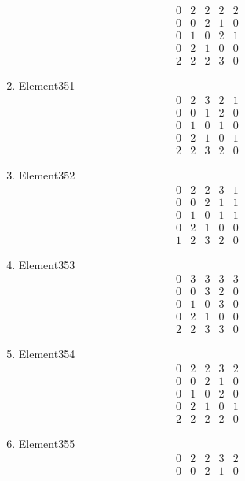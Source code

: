 \documentclass[12pt]{article}
\begin{document}
\begin{multicols}{3}
\begin{enumerate}
\begin{equation*}
\begin{array}{ccccc}
0&2&2&2&2\\
0&0&2&1&0\\
0&1&0&2&1\\
0&2&1&0&0\\
2&2&2&3&0
\end{array}
\end{equation*}
\item Element351
\begin{equation*}
\begin{array}{ccccc}
0&2&3&2&1\\
0&0&1&2&0\\
0&1&0&1&0\\
0&2&1&0&1\\
2&2&3&2&0
\end{array}
\end{equation*}
\item Element352
\begin{equation*}
\begin{array}{ccccc}
0&2&2&3&1\\
0&0&2&1&1\\
0&1&0&1&1\\
0&2&1&0&0\\
1&2&3&2&0
\end{array}
\end{equation*}
\item Element353
\begin{equation*}
\begin{array}{ccccc}
0&3&3&3&3\\
0&0&3&2&0\\
0&1&0&3&0\\
0&2&1&0&0\\
2&2&3&3&0
\end{array}
\end{equation*}
\item Element354
\begin{equation*}
\begin{array}{ccccc}
0&2&2&3&2\\
0&0&2&1&0\\
0&1&0&2&0\\
0&2&1&0&1\\
2&2&2&2&0
\end{array}
\end{equation*}
\item Element355
\begin{equation*}
\begin{array}{ccccc}
0&2&2&3&2\\
0&0&2&1&0\\

\end{array}
\end{equation*}
\end{enumerate}
\end{multicols}
\end{document}
